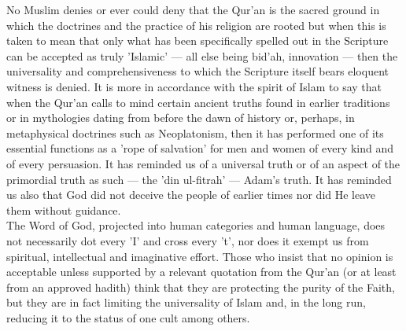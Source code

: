 \documentclass[10pt, twoside]{book}
\begin{document}
No Muslim denies or ever could deny that the Qur'an is the sacred ground in which the doctrines and 
the practice of his religion are rooted but when this is taken to mean that only what has been 
specifically spelled out in the Scripture can be accepted as truly 'Islamic' --- all else being bid'ah, 
innovation --- then the universality and comprehensiveness to which the Scripture itself bears eloquent 
witness is denied. It is more in accordance with the spirit of Islam to say that when the Qur'an 
calls to mind certain ancient truths found in earlier traditions or in mythologies dating from before 
the dawn of history or, perhaps, in metaphysical doctrines such as Neoplatonism, then it has 
performed one of its essential functions as a 'rope of salvation' for men and women of every kind and 
of every persuasion. It has reminded us of a universal truth or of an aspect of the primordial truth 
as such --- the 'din ul-fitrah' --- Adam's truth. It has reminded us also that God did not deceive the 
people of earlier times nor did He leave them without guidance. \\

The Word of God, projected into human categories and human language, does not necessarily dot every 
'I' and cross every 't', nor does it exempt us from spiritual, intellectual and imaginative effort. 
Those who insist that no opinion is acceptable unless supported by a relevant quotation from the 
Qur'an (or at least from an approved hadith) think that they are protecting the purity of the Faith, 
but they are in fact limiting the universality of Islam and, in the long run, reducing it to the 
status of one cult among others. \\
\end{document}
